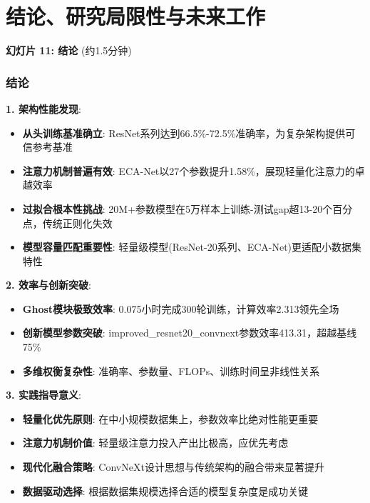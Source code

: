 \documentclass[10pt]{beamer}
\begin{document}
\section{结论、研究局限性与未来工作}
\begin{frame}{\textbf{幻灯片 11: 结论} (约1.5分钟)}
\frametitle{结论}

\vspace{-0.5em}
{\scriptsize

\textbf{1. 架构性能发现}:
\begin{itemize}
    \item \textbf{从头训练基准确立}: ResNet系列达到66.5\%-72.5\%准确率，为复杂架构提供可信参考基准
    \item \textbf{注意力机制普遍有效}: ECA-Net以27个参数提升1.58\%，展现轻量化注意力的卓越效率
    \item \textbf{过拟合根本性挑战}: 20M+参数模型在5万样本上训练-测试gap超13-20个百分点，传统正则化失效
    \item \textbf{模型容量匹配重要性}: 轻量级模型(ResNet-20系列、ECA-Net)更适配小数据集特性
\end{itemize}

\textbf{2. 效率与创新突破}:
\begin{itemize}
    \item \textbf{Ghost模块极致效率}: 0.075小时完成300轮训练，计算效率2.313领先全场
    \item \textbf{创新模型参数突破}: improved\_resnet20\_convnext参数效率413.31，超越基线75\%
    \item \textbf{多维权衡复杂性}: 准确率、参数量、FLOPs、训练时间呈非线性关系
\end{itemize}

\textbf{3. 实践指导意义}:
\begin{itemize}
    \item \textbf{轻量化优先原则}: 在中小规模数据集上，参数效率比绝对性能更重要
    \item \textbf{注意力机制价值}: 轻量级注意力投入产出比极高，应优先考虑
    \item \textbf{现代化融合策略}: ConvNeXt设计思想与传统架构的融合带来显著提升
    \item \textbf{数据驱动选择}: 根据数据集规模选择合适的模型复杂度是成功关键
\end{itemize}}


\end{frame}
\end{document}
